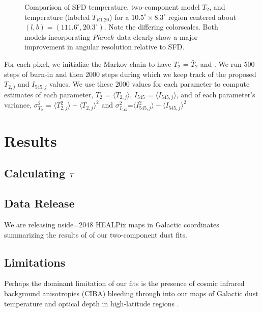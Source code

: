 \documentclass{emulateapj}
\newcommand{\PLANCK}{{\it Planck}}
\begin{document}
\begin{figure}
\begin{center}
\caption{\label{fig:comparison} Comparison of SFD temperature, two-component 
model $T_2$, and \cite{planckdust} temperature (labeled $T_{R1.20}$) for a
 $10.5^{\circ}\times8.3^{\circ}$  region centered about 
$(l,b) = (111.6^{\circ}, 20.3^{\circ})$. Note the 
differing colorscales. Both models incorporating \PLANCK~data clearly show a 
major improvement in angular resolution relative to SFD.}
\end{center}
\end{figure}

For each pixel, we initialize the Markov chain to have $T_2$ = $\bar{T}_2$ and
. We run 500 steps of burn-in and then 2000 steps during which we keep track
of the proposed $T_{2, j}$ and $I_{545, j}$ values. We use these 2000 values 
for each parameter to compute estimates of each parameter,  $T_2$ = 
$\langle T_{2, j} \rangle$, $I_{545}$ = $\langle I_{545, j} \rangle$, and of 
each parameter's variance, $\sigma^2_{T_2}$ = $\langle T^2_{2, j} \rangle-\langle T_{2, j} \rangle ^2$ and $\sigma^2_{I_{545}}$=$\langle I^2_{545, j} 
\rangle-\langle I_{545, j} \rangle ^2$

\section{Results}
\label{sec:results}

\subsection{Calculating $\tau$}

\subsection{Data Release}
We are releasing nside=2048 HEALPix maps in Galactic coordinates summarizing 
the results of of our two-component dust fits.


\subsection{Limitations}
Perhaps the dominant limitation of our fits is the presence of cosmic
infrared background anisotropies (CIBA) bleeding through into our maps of 
Galactic dust temperature and optical depth in high-latitude regions 
\citep{ciba}.
\end{document}
